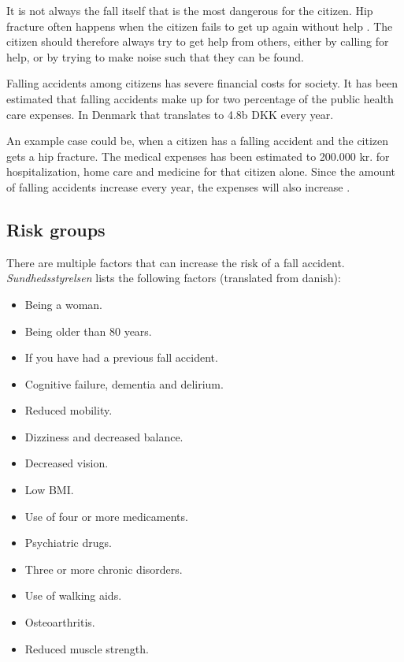 It is not always the fall itself that is the most dangerous for the citizen. Hip fracture often happens when the citizen fails to get up again without help \cite{CekuraFald}. The citizen should therefore always try to get help from others, either by calling for help, or by trying to make noise such that they can be found.

Falling accidents among citizens has severe financial costs for society. It has been estimated that falling accidents make up for two percentage of the public health care expenses. In Denmark that translates to 4.8b DKK\cite{faldkost} every year.

An example case could be, when a citizen has a falling accident and the citizen gets a hip fracture. The medical expenses has been estimated to 200.000 kr. for hospitalization, home care and medicine for that citizen alone. Since the amount of falling accidents increase every year, the expenses will also increase \cite{MagasinetSundhed:Pris}.

\subsection{Risk groups}
There are multiple factors that can increase the risk of a fall accident. \textit{Sundhedsstyrelsen} \cite{FaldArtikel} lists the following factors (translated from danish):

\begin{itemize}
    \item Being a woman.
    \item Being older than 80 years.
    \item If you have had a previous fall accident.
    \item Cognitive failure, dementia and delirium.
    \item Reduced mobility.
    \item Dizziness and decreased balance.
    \item Decreased vision.
    \item Low BMI.
    \item Use of four or more medicaments.
    \item Psychiatric drugs.
    \item Three or more chronic disorders.
    \item Use of walking aids.
    \item Osteoarthritis.
    \item Reduced muscle strength.
\end{itemize}

